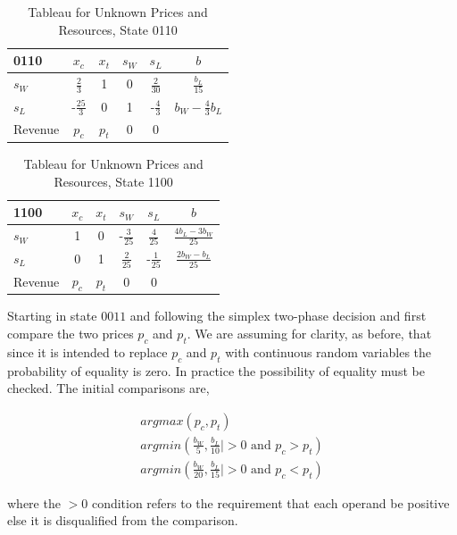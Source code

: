 \begin{table}
\centering
\begin{tabular}{| l | c c c c | c |}
\hline
0110    & $x_c$ & $x_t$ & $s_W$ & $s_L$ & $b$\\
\hline
$s_W$   & $\frac{2}{3}$    & 1  & 0  & $\frac{2}{30}$  & $\frac{b_L}{15}$\\
$s_L$   & -$\frac{25}{3}$  & 0  & 1  & -$\frac{4}{3}$  & $b_W - \frac{4}{3}b_L$\\
\hline
Revenue & $p_c$    & $p_t$    & 0     & 0     &\\
\hline
\end{tabular}
  \caption[Tableau for Unknown Prices and Resources, State 0110]
          {Tableau for Unknown Prices and Resources, State 0110}
  \label{tab:pr0110}
\end{table}

\begin{table}
\centering
\begin{tabular}{| l | c c c c | c |}
\hline
1100    & $x_c$ & $x_t$ & $s_W$ & $s_L$ & $b$\\
\hline
$s_W$   & 1  & 0  & -$\frac{3}{25}$  & $\frac{4}{25}$  & $\frac{4b_L-3b_W}{25}$\\
$s_L$   & 0  & 1  & $\frac{2}{25}$  & -$\frac{1}{25}$  & $\frac{2b_W-b_L}{25}$\\
\hline
Revenue & $p_c$    & $p_t$    & 0     & 0     &\\
\hline
\end{tabular}
  \caption[Tableau for Unknown Prices and Resources, State 1100]
          {Tableau for Unknown Prices and Resources, State 1100}
  \label{tab:pr1100}
\end{table}

Starting in state $0011$ and following the simplex two-phase decision and first compare the two prices $p_c$ and $p_t$. We are assuming for clarity, as before, that since it is intended to replace $p_c$ and $p_t$ with continuous random variables the probability of equality is zero. In practice the possibility of equality must be checked. The initial comparisons are,

\begin{align*}
argmax(p_c, p_t)\\
argmin(\frac{b_W}{5}, \frac{b_L}{10}  | > 0 \text{ and } p_c > p_t)\\
argmin(\frac{b_W}{20}, \frac{b_L}{15} | > 0 \text{ and } p_c < p_t)
\end{align*}

where the $> 0$ condition refers to the requirement that each operand be positive else it is disqualified from the comparison.

